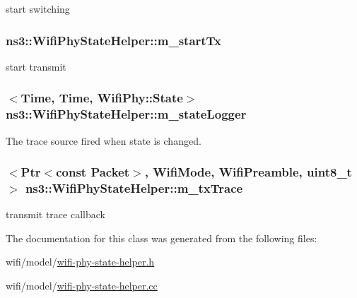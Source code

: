 start switching 

\subsubsection[{\texorpdfstring{m\+\_\+start\+Tx}{m_startTx}}]{ ns3\+::\+Wifi\+Phy\+State\+Helper\+::m\+\_\+start\+Tx\hspace{0.3cm}{\ttfamily [private]}}\hypertarget{classns3_1_1WifiPhyStateHelper_a9bb8ffc27c3a896f33681f8c1a17cf19}{}\label{classns3_1_1WifiPhyStateHelper_a9bb8ffc27c3a896f33681f8c1a17cf19}


start transmit 

\subsubsection[{\texorpdfstring{m\+\_\+state\+Logger}{m_stateLogger}}]{$<${\bf Time}, {\bf Time}, {\bf Wifi\+Phy\+::\+State}$>$ ns3\+::\+Wifi\+Phy\+State\+Helper\+::m\+\_\+state\+Logger\hspace{0.3cm}{\ttfamily [private]}}\hypertarget{classns3_1_1WifiPhyStateHelper_a5a88d96547b35744255e922440ff525d}{}\label{classns3_1_1WifiPhyStateHelper_a5a88d96547b35744255e922440ff525d}
The trace source fired when state is changed. 
\subsubsection[{\texorpdfstring{m\+\_\+tx\+Trace}{m_txTrace}}]{$<${\bf Ptr}$<$const {\bf Packet}$>$, {\bf Wifi\+Mode}, {\bf Wifi\+Preamble}, uint8\+\_\+t$>$ ns3\+::\+Wifi\+Phy\+State\+Helper\+::m\+\_\+tx\+Trace\hspace{0.3cm}{\ttfamily [private]}}\hypertarget{classns3_1_1WifiPhyStateHelper_a5e1f9dd965eb7d83ffd469c15e54364b}{}\label{classns3_1_1WifiPhyStateHelper_a5e1f9dd965eb7d83ffd469c15e54364b}


transmit trace callback 



The documentation for this class was generated from the following files\+:\begin{DoxyCompactItemize}
\item 
wifi/model/\hyperlink{wifi-phy-state-helper_8h}{wifi-\/phy-\/state-\/helper.\+h}\item 
wifi/model/\hyperlink{wifi-phy-state-helper_8cc}{wifi-\/phy-\/state-\/helper.\+cc}\end{DoxyCompactItemize}
